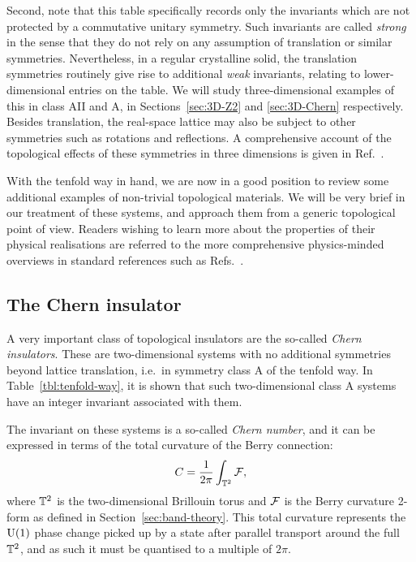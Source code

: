 Second, note that this table specifically records only the invariants which are not protected by a commutative unitary symmetry. Such invariants are called \emph{strong} in the sense that they do not rely on any assumption of translation or similar symmetries. Nevertheless, in a regular crystalline solid, the translation symmetries routinely give rise to additional \emph{weak} invariants, relating to lower-dimensional entries on the table. We will study three-dimensional examples of this in class AII and A, in Sections~\ref{sec:3D-Z2} and \ref{sec:3D-Chern} respectively. Besides translation, the real-space lattice may also be subject to other symmetries such as rotations and reflections. A comprehensive account of the topological effects of these symmetries in three dimensions is given in Ref.~\cite{Shiozaki_AHSS}.


\label{sec:insulators}

With the tenfold way in hand, we are now in a good position to review some additional examples of non-trivial topological materials. We will be very brief in our treatment of these systems, and approach them from a generic topological point of view. Readers wishing to learn more about the properties of their physical realisations are referred to the more comprehensive physics-minded overviews in standard references such as Refs.~\cite{Bernevig_topological-insulators,Asboth_topo-course,Akhmerov_online-course}.

\subsection{The Chern insulator}\label{sec:Chern}

A very important class of topological insulators are the so-called \emph{Chern insulators}. These are two-dimensional systems with no additional symmetries beyond lattice translation, i.e.\ in symmetry class A of the tenfold way. In Table~\ref{tbl:tenfold-way}, it is shown that such two-dimensional class A systems have an integer invariant associated with them.

The invariant on these systems is a so-called \emph{Chern number}, and it can be expressed in terms of the total curvature of the Berry connection:
\begin{equation}\label{eq:Chern-number}
	C = \frac{1}{2\pi}\int_{\mathbb{T}^2} \mathcal{F},
\end{equation}
where $\mathbb{T}^2$ is the two-dimensional Brillouin torus and $\mathcal{F}$ is the Berry curvature 2-form as defined in Section~\ref{sec:band-theory}. This total curvature represents the $\operatorname{U}(1)$ phase change picked up by a state after parallel transport around the full $\mathbb{T}^2$, and as such it must be quantised to a multiple of $2\pi$.

